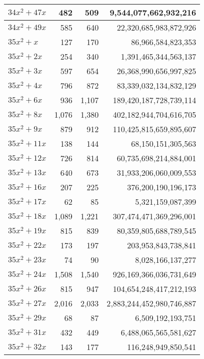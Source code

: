 \documentclass[a4paper]{amsproc}
\theoremstyle{plain}
\begin{document}
\begin{longtable}{ | l | r | r | r | }
$34x^2 + 47x$ & 482 & 509 & 9{,}544{,}077{,}662{,}932{,}216 \\ \hline
$34x^2 + 49x$ & 585 & 640 & 22{,}320{,}685{,}983{,}872{,}926 \\ \hline
$35x^2 + x$ & 127 & 170 & 86{,}966{,}584{,}823{,}353 \\ \hline
$35x^2 + 2x$ & 254 & 340 & 1{,}391{,}465{,}344{,}563{,}137 \\ \hline
$35x^2 + 3x$ & 597 & 654 & 26{,}368{,}990{,}656{,}997{,}825 \\ \hline
$35x^2 + 4x$ & 796 & 872 & 83{,}339{,}032{,}134{,}832{,}129 \\ \hline
$35x^2 + 6x$ & 936 & 1{,}107 & 189{,}420{,}187{,}728{,}739{,}114 \\ \hline
$35x^2 + 8x$ & 1{,}076 & 1{,}380 & 402{,}182{,}944{,}704{,}616{,}705 \\ \hline
$35x^2 + 9x$ & 879 & 912 & 110{,}425{,}815{,}659{,}895{,}607 \\ \hline
$35x^2 + 11x$ & 138 & 144 & 68{,}150{,}151{,}305{,}563 \\ \hline
$35x^2 + 12x$ & 726 & 814 & 60{,}735{,}698{,}214{,}884{,}001 \\ \hline
$35x^2 + 13x$ & 640 & 673 & 31{,}933{,}206{,}060{,}009{,}553 \\ \hline
$35x^2 + 16x$ & 207 & 225 & 376{,}200{,}190{,}196{,}173 \\ \hline
$35x^2 + 17x$ & 62 & 85 & 5{,}321{,}159{,}087{,}399 \\ \hline
$35x^2 + 18x$ & 1{,}089 & 1{,}221 & 307{,}474{,}471{,}369{,}296{,}001 \\ \hline
$35x^2 + 19x$ & 815 & 839 & 80{,}359{,}805{,}688{,}789{,}545 \\ \hline
$35x^2 + 22x$ & 173 & 197 & 203{,}953{,}843{,}738{,}841 \\ \hline
$35x^2 + 23x$ & 74 & 90 & 8{,}028{,}166{,}137{,}277 \\ \hline
$35x^2 + 24x$ & 1{,}508 & 1{,}540 & 926{,}169{,}366{,}036{,}731{,}649 \\ \hline
$35x^2 + 26x$ & 815 & 947 & 104{,}654{,}248{,}417{,}212{,}193 \\ \hline
$35x^2 + 27x$ & 2{,}016 & 2{,}033 & 2{,}883{,}244{,}452{,}980{,}746{,}887 \\ \hline
$35x^2 + 29x$ & 68 & 87 & 6{,}509{,}192{,}193{,}751 \\ \hline
$35x^2 + 31x$ & 432 & 449 & 6{,}488{,}065{,}565{,}581{,}627 \\ \hline
$35x^2 + 32x$ & 143 & 177 & 116{,}248{,}949{,}850{,}541 \\ \hline

\end{longtable}
\end{document}

